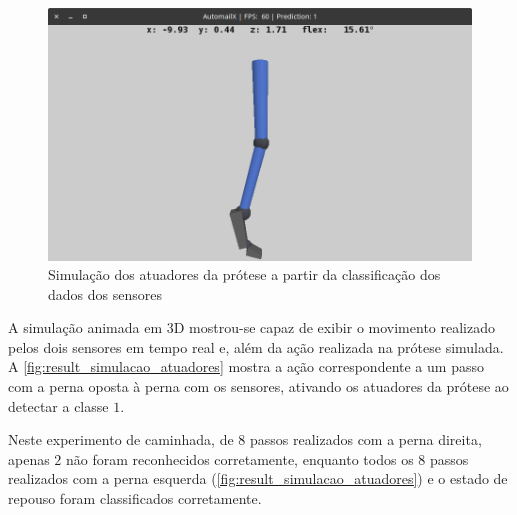 \begin{figure}[ht]
	\caption{\label{fig:result_simulacao_atuadores}Simulação dos atuadores da prótese a partir da classificação dos dados dos sensores}
	\begin{center}
	    \includegraphics[width=\textwidth]{resources/result_simulacao_atuadores}
	\end{center}
\end{figure}

A simulação animada em 3D mostrou-se capaz de exibir o movimento realizado pelos dois sensores em tempo real e, além da ação realizada na prótese simulada. A \autoref{fig:result_simulacao_atuadores} mostra a ação correspondente a um passo com a perna oposta à perna com os sensores, ativando os atuadores da prótese ao detectar a classe \(1\).

Neste experimento de caminhada, de \(8\) passos realizados com a perna direita, apenas \(2\) não foram reconhecidos corretamente, enquanto todos os \(8\) passos realizados com a perna esquerda (\autoref{fig:result_simulacao_atuadores}) e o estado de repouso foram classificados corretamente.